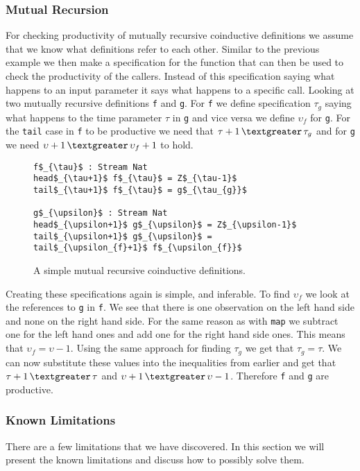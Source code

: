 \subsubsection{Mutual Recursion}
For checking productivity of mutually recursive coinductive definitions we assume that we know what definitions refer to each other. Similar to the previous example we then make a specification for the function that can then be used to check the productivity of the callers. Instead of this specification saying what happens to an input parameter it says what happens to a specific call. Looking at two mutually recursive definitions \texttt{f} and \texttt{g}. For \texttt{f} we define specification $\tau_{g}$ saying what happens to the time parameter $\tau$ in \texttt{g} and vice versa we define $\upsilon_{f}$ for \texttt{g}. For the \texttt{tail} case in \texttt{f} to be productive we need that $\tau+1\,\textgreater\,\tau_{g}$ and for \texttt{g} we need $\upsilon+1\,\textgreater\,\upsilon_{f}+1$ to hold.

\begin{figure}
\begin{Verbatim}[commandchars=\\\{\},codes={\catcode`$=3\catcode`_=8}]
f$_{\tau}$ : Stream Nat
head$_{\tau+1}$ f$_{\tau}$ = Z$_{\tau-1}$
tail$_{\tau+1}$ f$_{\tau}$ = g$_{\tau_{g}}$

g$_{\upsilon}$ : Stream Nat
head$_{\upsilon+1}$ g$_{\upsilon}$ = Z$_{\upsilon-1}$
tail$_{\upsilon+1}$ g$_{\upsilon}$ = tail$_{\upsilon_{f}+1}$ f$_{\upsilon_{f}}$
\end{Verbatim}
\caption{A simple mutual recursive coinductive definitions.}
\label{fig:mutRec1}
\end{figure}

Creating these specifications again is simple, and inferable. To find $\upsilon_{f}$ we look at the references to \texttt{g} in \texttt{f}. We see that there is one observation on the left hand side and none on the right hand side. For the same reason as with \texttt{map} we subtract one for the left hand ones and add one for the right hand side ones. This means that $\upsilon_{f} = \upsilon - 1$. Using the same approach for finding $\tau_{g}$ we get that $\tau_{g} = \tau$. We can now substitute these values into the inequalities from earlier and get that $\tau+1\,\textgreater\,\tau$ and $\upsilon+1\,\textgreater\,\upsilon - 1$. Therefore \texttt{f} and \texttt{g} are productive.

\subsubsection{Known Limitations}
There are a few limitations that we have discovered. In this section we will present the known limitations and discuss how to possibly solve them.

